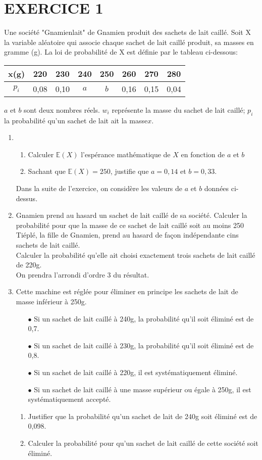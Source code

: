 \documentclass[13pts]{report}
\begin{document}
	\section*{EXERCICE 1}	
	Une société "Gnamienlait" de Gnamien produit des sachets de lait caillé. Soit X la variable aléatoire qui associe chaque sachet de lait caillé produit, sa masses en gramme (g). La loi de probabilité de X est définie par le tableau ci-dessous:
	\begin{tabular}{|c|c|c|c|c|c|c|c|}
		\hline 
		x(g) & 220 &230 & 240 & 250 & 260 & 270 & 280 \\ \hline 
		$p_i$ & 0,08& 0,10 & $a$ &$b$& 0,16 & 0,15 & 0,04 
	\\	\hline
	\end{tabular}
	$a$ et $b$ sont deux nombres réels.
	$w_i$ représente la masse du sachet de lait caillé; $p_i$ la probabilité qu'un sachet de lait ait la masse$x$.
	\begin{enumerate}
		\item \begin{enumerate}
			\item Calculer $\mathbb{E}(X)$ l'espérance mathématique de $X$ en fonction de $a$ et $b$
			\item Sachant que $\mathbb{E}(X)=250$, justifie que $a=0,14$ et $b=0,33.$ 
		\end{enumerate}
	Dans la suite de l'exercice, on considère les valeurs de $a$ et $b$ données ci-dessus.
	\item Gnamien prend au hasard un sachet de lait caillé de sa société.  Calculer la probabilité pour que la masse de ce sachet de lait caillé soit au moins 250\\
	Tiéplé, la fille de Gnamien, prend au hasard de façon indépendante cins sachets de lait caillé.\\
	Calculer la probabilité qu'elle ait choisi exactement trois sachets de lait caillé de 220g.\\
	On prendra l'arrondi d'ordre 3 du résultat.
	\item Cette machine est réglée pour éliminer en principe les sachets de lait de masse inférieur à 250g.
		\begin{enumerate}
			\item[$\bullet$] Si un sachet de lait caillé à 240g, la probabilité qu'il soit éliminé est de 0,7.
			\item[$\bullet$] Si un sachet de lait caillé à 230g, la probabilité qu'il soit éliminé est de 0,8.
			\item[$\bullet$] Si un sachet de lait caillé à 220g, il est systématiquement éliminé.
			\item[$\bullet$] Si un sachet  de lait caillé à une masse supérieur ou égale à 250g, il est systématiquement accepté.
		\end{enumerate}
	\begin{enumerate}
		\item Justifier que la probabilité qu'un sachet de lait de 240g soit éliminé est de 0,098.
		\item Calculer la probabilité pour qu'un sachet de lait caillé de cette société soit éliminé.
	\end{enumerate}
	\end{enumerate}
	
\end{document}
